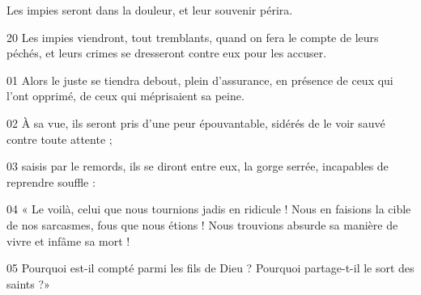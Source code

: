Les impies seront dans la douleur, et leur souvenir périra.

20 Les impies viendront, tout tremblants, quand on fera le compte de leurs péchés, et leurs crimes se dresseront contre eux pour les accuser.

01 Alors le juste se tiendra debout, plein d’assurance, en présence de ceux qui l’ont opprimé, de ceux qui méprisaient sa peine.

02 À sa vue, ils seront pris d’une peur épouvantable, sidérés de le voir sauvé contre toute attente ;

03 saisis par le remords, ils se diront entre eux, la gorge serrée, incapables de reprendre souffle :

04 « Le voilà, celui que nous tournions jadis en ridicule ! Nous en faisions la cible de nos sarcasmes, fous que nous étions ! Nous trouvions absurde sa manière de vivre et infâme sa mort !

05 Pourquoi est-il compté parmi les fils de Dieu ? Pourquoi partage-t-il le sort des saints ?»